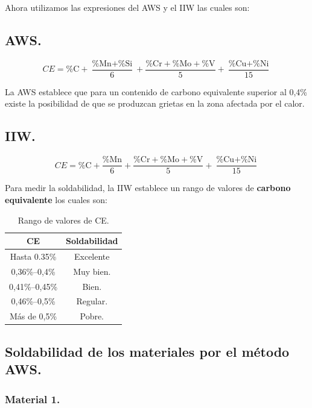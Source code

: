 \documentclass[12pt,a4paper]{article}
\begin{document}
Ahora utilizamos las expresiones del AWS y el IIW las cuales son:

\subsection{AWS.}

\begin{equation*}
    CE = \text{\%C} + \frac{\text{\%Mn}+\text{\%Si}}{6} + \frac{\text{\%Cr}+\text{\%Mo}+\text{\%V}}{5} + \frac{\text{\%Cu}+\text{\%Ni}}{15}
\end{equation*}

La AWS establece que para un contenido de carbono equivalente superior al 0,4\% existe la posibilidad de que se produzcan grietas en la zona afectada por el calor.

\subsection{IIW.}

\begin{equation*}
    CE = \text{\%C} + \frac{\text{\%Mn}}{6} + \frac{\text{\%Cr}+\text{\%Mo}+\text{\%V}}{5} + \frac{\text{\%Cu}+\text{\%Ni}}{15}
\end{equation*}

Para medir la soldabilidad, la IIW establece un rango de valores de \textbf{carbono equivalente} los cuales son:

\begin{table}[h!]
    \centering
    \begin{tabular}{|c|c|}
        \hline
        \textbf{CE} & \textbf{Soldabilidad} \\ \hline
        Hasta 0.35\% & Excelente \\ \hline
        0,36\%--0,4\% & Muy bien. \\ \hline
        0,41\%--0,45\% & Bien. \\ \hline
        0,46\%--0,5\% & Regular. \\ \hline
        Más de 0,5\% & Pobre. \\ \hline
    \end{tabular}
    \caption{Rango de valores de CE.}
\end{table}

\subsection{Soldabilidad de los materiales por el método AWS.}

\subsubsection{Material 1.}
\end{document}
